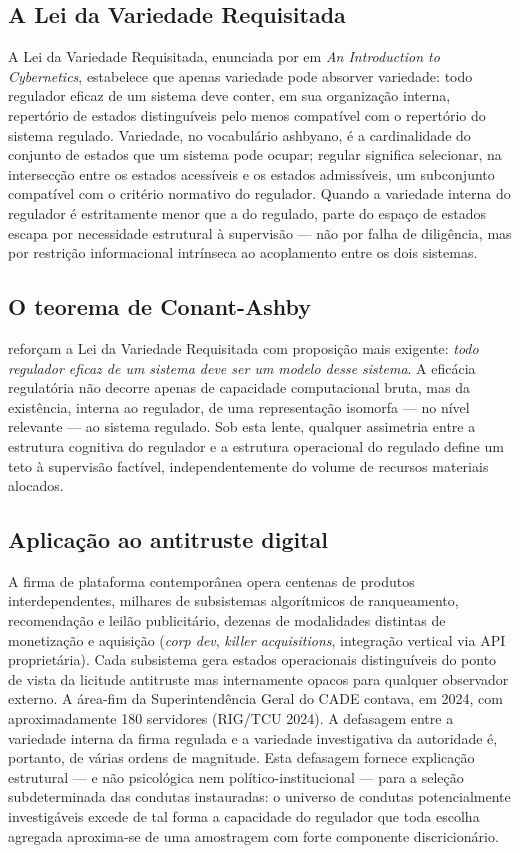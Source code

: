 \documentclass[12pt,a4paper]{article}
\begin{document}
\subsection{A Lei da Variedade Requisitada}

A Lei da Variedade Requisitada, enunciada por \citet{ashby1956introduction} em
\emph{An Introduction to Cybernetics}, estabelece que apenas variedade pode
absorver variedade: todo regulador eficaz de um sistema deve conter, em sua
organização interna, repertório de estados distinguíveis pelo menos compatível
com o repertório do sistema regulado. Variedade, no vocabulário ashbyano, é a
cardinalidade do conjunto de estados que um sistema pode ocupar; regular
significa selecionar, na intersecção entre os estados acessíveis e os estados
admissíveis, um subconjunto compatível com o critério normativo do regulador.
Quando a variedade interna do regulador é estritamente menor que a do regulado,
parte do espaço de estados escapa por necessidade estrutural à supervisão ---
não por falha de diligência, mas por restrição informacional intrínseca ao
acoplamento entre os dois sistemas.

\subsection{O teorema de Conant-Ashby}

\citet{conant1970good} reforçam a Lei da Variedade Requisitada com proposição
mais exigente: \emph{todo regulador eficaz de um sistema deve ser um modelo
desse sistema}. A eficácia regulatória não decorre apenas de capacidade
computacional bruta, mas da existência, interna ao regulador, de uma
representação isomorfa --- no nível relevante --- ao sistema regulado. Sob esta
lente, qualquer assimetria entre a estrutura cognitiva do regulador e a
estrutura operacional do regulado define um teto à supervisão factível,
independentemente do volume de recursos materiais alocados.

\subsection{Aplicação ao antitruste digital}

A firma de plataforma contemporânea opera centenas de produtos interdependentes,
milhares de subsistemas algorítmicos de ranqueamento, recomendação e leilão
publicitário, dezenas de modalidades distintas de monetização e aquisição
(\emph{corp dev}, \emph{killer acquisitions}, integração vertical via API
proprietária). Cada subsistema gera estados operacionais distinguíveis do ponto
de vista da licitude antitruste mas internamente opacos para qualquer
observador externo. A área-fim da Superintendência Geral do CADE contava, em
2024, com aproximadamente 180 servidores (RIG/TCU 2024). A defasagem entre a
variedade interna da firma regulada e a variedade investigativa da autoridade
é, portanto, de várias ordens de magnitude. Esta defasagem fornece explicação
estrutural --- e não psicológica nem político-institucional --- para a seleção
subdeterminada das condutas instauradas: o universo de condutas potencialmente
investigáveis excede de tal forma a capacidade do regulador que toda escolha
agregada aproxima-se de uma amostragem com forte componente discricionário.
\end{document}
